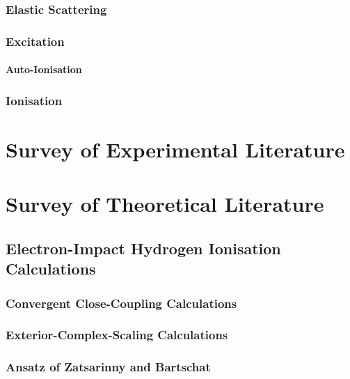 \documentclass[draft]{article}
\begin{document}
\subsubsection{Elastic Scattering}
\label{sec:e-he-elastic-scattering}

\subsubsection{Excitation}
\label{sec:e-he-excitation}

\paragraph{Auto-Ionisation}

\subsubsection{Ionisation}
\label{sec:e-he-ionisation}

\section{Survey of Experimental Literature}
\label{sec:survey-experimental}

\section{Survey of Theoretical Literature}
\label{sec:survey-theoretical}

\subsection{Electron-Impact Hydrogen Ionisation Calculations}
\label{sec:e-h-ionisation-calculations}

\subsubsection{Convergent Close-Coupling Calculations}
\label{sec:e-h-ccc-calculations}

\subsubsection{Exterior-Complex-Scaling Calculations}
\label{sec:e-h-ecs-calculations}

\subsubsection{Ansatz of Zatsarinny and Bartschat}
\label{sec:e-h-ecs-calculations}
\end{document}
